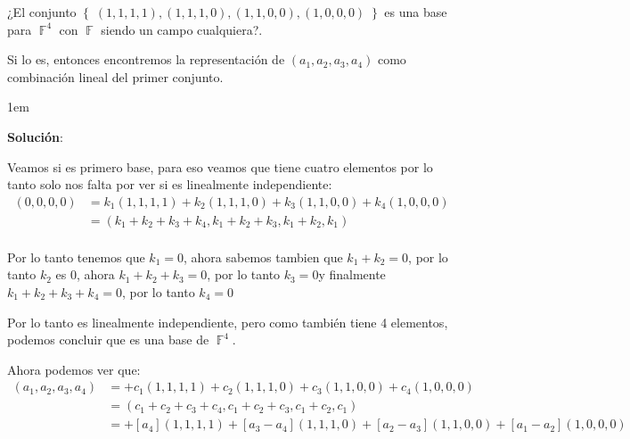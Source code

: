 \documentclass[12pt, fleqn]{article}                             %
\newenvironment{SmallIndentation}[1][0.75em]                    %
        {\begin{adjustwidth}{#1}{}\begin{footnotesize}}             %
        {\end{footnotesize}\end{adjustwidth}}                       %
\theoremstyle{break}                                            %
\DeclareMathOperator \GenericField {\mathbb{F}}                 %
\newcommand{\Set}[1]    {\left\{ \; #1 \; \right\}}             %
\begin{document}
    ¿El conjunto $\Set{(1, 1, 1, 1), (1, 1, 1, 0), (1, 1, 0, 0), (1, 0, 0, 0)}$ es una base
    para $\GenericField^4$ con $\GenericField$ siendo un campo cualquiera?.

    Si lo es, entonces encontremos la representación de $(a_1, a_2, a_3, a_4)$ como combinación
    lineal del primer conjunto.

    \begin{SmallIndentation}[1em]
        \textbf{Solución}:

        Veamos si es primero base, para eso veamos que tiene cuatro elementos por lo tanto
        solo nos falta por ver si es linealmente independiente:
        \begin{align*}
            (0, 0, 0, 0)
                &= k_1(1, 1, 1, 1) + k_2(1, 1, 1, 0) + k_3(1, 1, 0, 0) + k_4(1, 0, 0, 0)    \\
                &= (k_1+k_2+k_3+k_4, k_1+k_2+k_3, k_1+k_2, k_1)                             \\
        \end{align*}

        Por lo tanto tenemos que $k_1 = 0$, ahora sabemos tambien que $k_1+k_2 = 0$, por lo tanto $k_2$
        es $0$, ahora $k_1+k_2+k_3 = 0$, por lo tanto $k_3=0 $y finalmente $k_1+k_2+k_3+k_4 = 0$, por
        lo tanto $k_4 = 0$

        Por lo tanto es linealmente independiente, pero como también tiene 4 elementos, podemos concluir que 
        es una base de $\GenericField^4$.

        Ahora podemos ver que:
        \begin{align*}
            (a_1, a_2, a_3, a_4)
                &= 
                    + c_1 (1, 1, 1, 1)
                    + c_2 (1, 1, 1, 0)
                    + c_3 (1, 1, 0, 0)
                    + c_4 (1, 0, 0, 0)                                  \\
                &= 
                    (c_1+c_2+c_3+c_4, c_1+c_2+c_3, c_1+c_2, c_1)        \\
                &= 
                    + [a_4]       (1, 1, 1, 1)
                    + [a_3 - a_4] (1, 1, 1, 0)
                    + [a_2 - a_3] (1, 1, 0, 0)
                    + [a_1 - a_2] (1, 0, 0, 0)
        \end{align*}

    \end{SmallIndentation}
\end{document}
